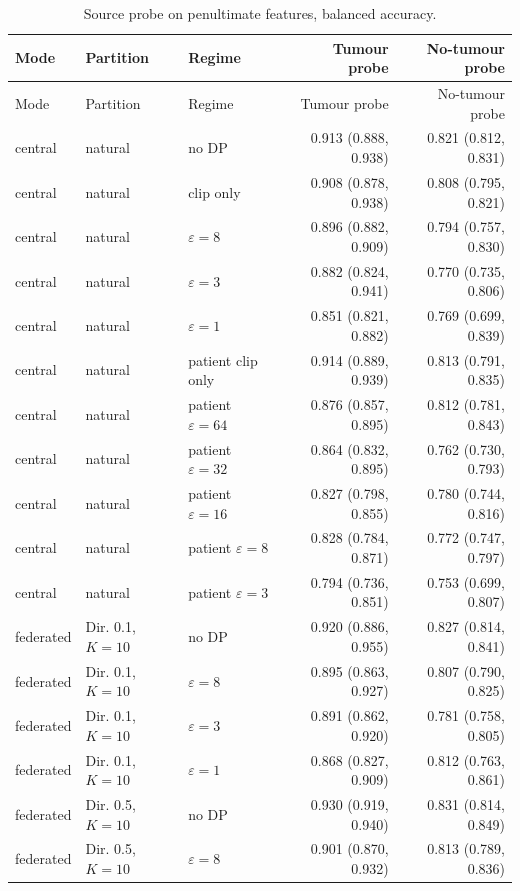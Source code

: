 {\footnotesize
\begin{longtable}{lllrr}
\caption{Source probe on penultimate features, balanced accuracy.}\label{tab:s_probe}\\
\toprule
Mode & Partition & Regime & Tumour probe & No-tumour probe \\
\midrule
\endfirsthead
\toprule
Mode & Partition & Regime & Tumour probe & No-tumour probe \\
\midrule
\endhead
\bottomrule
\endlastfoot
central & natural & no DP & 0.913 (0.888, 0.938) & 0.821 (0.812, 0.831) \\
central & natural & clip only & 0.908 (0.878, 0.938) & 0.808 (0.795, 0.821) \\
central & natural & $\varepsilon=8$ & 0.896 (0.882, 0.909) & 0.794 (0.757, 0.830) \\
central & natural & $\varepsilon=3$ & 0.882 (0.824, 0.941) & 0.770 (0.735, 0.806) \\
central & natural & $\varepsilon=1$ & 0.851 (0.821, 0.882) & 0.769 (0.699, 0.839) \\
central & natural & patient clip only & 0.914 (0.889, 0.939) & 0.813 (0.791, 0.835) \\
central & natural & patient $\varepsilon=64$ & 0.876 (0.857, 0.895) & 0.812 (0.781, 0.843) \\
central & natural & patient $\varepsilon=32$ & 0.864 (0.832, 0.895) & 0.762 (0.730, 0.793) \\
central & natural & patient $\varepsilon=16$ & 0.827 (0.798, 0.855) & 0.780 (0.744, 0.816) \\
central & natural & patient $\varepsilon=8$ & 0.828 (0.784, 0.871) & 0.772 (0.747, 0.797) \\
central & natural & patient $\varepsilon=3$ & 0.794 (0.736, 0.851) & 0.753 (0.699, 0.807) \\
federated & Dir. 0.1, $K{=}10$ & no DP & 0.920 (0.886, 0.955) & 0.827 (0.814, 0.841) \\
federated & Dir. 0.1, $K{=}10$ & $\varepsilon=8$ & 0.895 (0.863, 0.927) & 0.807 (0.790, 0.825) \\
federated & Dir. 0.1, $K{=}10$ & $\varepsilon=3$ & 0.891 (0.862, 0.920) & 0.781 (0.758, 0.805) \\
federated & Dir. 0.1, $K{=}10$ & $\varepsilon=1$ & 0.868 (0.827, 0.909) & 0.812 (0.763, 0.861) \\
federated & Dir. 0.5, $K{=}10$ & no DP & 0.930 (0.919, 0.940) & 0.831 (0.814, 0.849) \\
federated & Dir. 0.5, $K{=}10$ & $\varepsilon=8$ & 0.901 (0.870, 0.932) & 0.813 (0.789, 0.836) \\

\end{longtable}}
